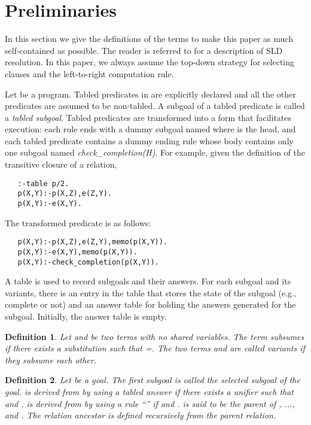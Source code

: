 \documentclass{tlp}
\newtheorem{definition}{Definition} \newtheorem{example}{Example} \newcommand{\pivot}[1]{\mathbin{\, {#1} \,}}
\begin{document}
\section{Preliminaries}
In this section we give the definitions of the terms to make this paper as much self-contained as possible. The reader is referred to \cite{Lloyd88} for a description of SLD resolution. In this paper, we always assume the top-down strategy for selecting clauses and the left-to-right computation rule.

Let  be a program. Tabled predicates in  are explicitly declared and all the other predicates are assumed to be non-tabled. A subgoal of a tabled predicate is called a {\it tabled subgoal}. Tabled predicates are transformed into a form that facilitates execution: each rule ends with a dummy subgoal named  where  is the head, and each tabled predicate contains a dummy ending rule whose body contains only one subgoal named {\it check\_completion(H)}. For example, given the definition of the transitive closure of a relation,
\begin{verbatim}
   :-table p/2.
   p(X,Y):-p(X,Z),e(Z,Y).
   p(X,Y):-e(X,Y).
\end{verbatim}
The transformed predicate is as follows:
\begin{verbatim}
   p(X,Y):-p(X,Z),e(Z,Y),memo(p(X,Y)). 
   p(X,Y):-e(X,Y),memo(p(X,Y)).               
   p(X,Y):-check_completion(p(X,Y)).          
\end{verbatim}

A table is used to record subgoals and their answers. For each subgoal and its variants, there is an entry in the table that stores the state of the subgoal (e.g., complete or not) and an answer table for holding the answers generated for the subgoal. Initially, the answer table is empty. 

\begin{definition} Let  and  be two terms with no shared variables. The term  {\it subsumes}  if there exists a substitution  such that =. The two terms  and  are called {\it variants} if they subsume each other. 
\end{definition}

\begin{definition} Let  be a goal. The first subgoal  is called the {\it selected subgoal} of the goal.  is {\it derived} from  by using a tabled {\it answer}  if there exists a unifier  such that  and .  is {\it derived} from  by using a rule ``'' if  and .  is said to be the {\it parent} of , ..., and . The relation {\it ancestor} is defined recursively from the parent relation.
\end{definition}
\end{document}
